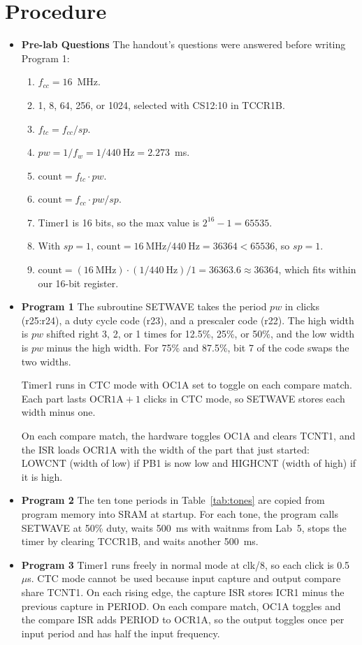 \documentclass[11pt]{article}
\begin{document}
\section{Procedure}
\begin{itemize}

\item \textbf{Pre-lab Questions} The handout's questions were answered before writing Program 1:
\begin{enumerate}[label=(\alph*)]
  \item $f_{cc} = 16$~MHz.
  \item 1, 8, 64, 256, or 1024, selected with CS12:10 in TCCR1B.
  \item $f_{tc} = f_{cc} / sp$.
  \item $pw = 1/f_w = 1/440~\text{Hz} = 2.273$~ms.
  \item $\text{count} = f_{tc} \cdot pw$.
  \item $\text{count} = f_{cc} \cdot pw / sp$.
  \item Timer1 is 16 bits, so the max value is $2^{16} - 1 = 65535$.
  \item With $sp = 1$, $\text{count} = 16~\text{MHz} / 440~\text{Hz} = 36364 < 65536$, so $sp = 1$.
  \item $\text{count} = (16~\text{MHz}) \cdot (1/440~\text{Hz}) / 1 = 36363.6 \approx 36364$, which fits within our 16-bit register.
\end{enumerate}

\item \textbf{Program 1} The subroutine SETWAVE takes the period $pw$ in clicks (r25:r24), a duty cycle code (r23), and a prescaler code (r22). The high width is $pw$ shifted right 3, 2, or 1 times for 12.5\%, 25\%, or 50\%, and the low width is $pw$ minus the high width. For 75\% and 87.5\%, bit 7 of the code swaps the two widths.

Timer1 runs in CTC mode with OC1A set to toggle on each compare match. Each part lasts $\text{OCR1A} + 1$ clicks in CTC mode, so SETWAVE stores each width minus one.

On each compare match, the hardware toggles OC1A and clears TCNT1, and the ISR loads OCR1A with the width of the part that just started: LOWCNT (width of low) if PB1 is now low and HIGHCNT (width of high) if it is high.

\item \textbf{Program 2} The ten tone periods in Table~\ref{tab:tones} are copied from program memory into SRAM at startup. For each tone, the program calls SETWAVE at 50\% duty, waits 500~ms with waitnms from Lab~5, stops the timer by clearing TCCR1B, and waits another 500~ms.

\item \textbf{Program 3} Timer1 runs freely in normal mode at clk/8, so each click is 0.5~$\mu$s. CTC mode cannot be used because input capture and output compare share TCNT1. On each rising edge, the capture ISR stores ICR1 minus the previous capture in PERIOD. On each compare match, OC1A toggles and the compare ISR adds PERIOD to OCR1A, so the output toggles once per input period and has half the input frequency.
\end{itemize}
\end{document}
